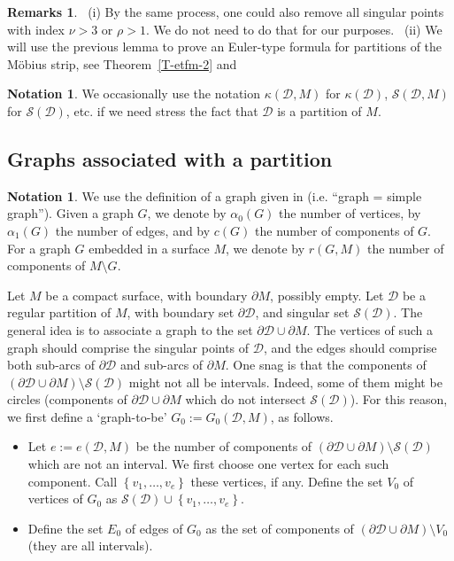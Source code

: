 \documentclass[12pt,a4paper]{amsart}
\theoremstyle{plain} %
\theoremstyle{definition}
\newtheorem{remarks}[theorem]{Remarks}
\newtheorem{notation}[theorem]{Notation}
\numberwithin{equation}{section}
\numberwithin{figure}{section}
\numberwithin{table}{section}
\newcommand{\cD}{\mathcal{D}}
\newcommand{\cS}{\mathcal{S}}
\newcommand{\sm}{\!\setminus\!}
\newcommand{\set}[1]{\left\lbrace #1 \right\rbrace}
\begin{document}
\begin{remarks}\label{R-parti-norm}~(i) By the same process, one could also remove all singular points with index $\nu > 3$ or $\rho > 1$. We do not need to do that for our purposes. ~(ii) We will use the previous lemma to prove an Euler-type formula for partitions of the M\"{o}bius strip, see Theorem~\ref{T-etfm-2} and
\cite{BeHe2020m}
\end{remarks}%


\begin{notation}\label{N-parti-4}
We occasionally use the notation $\kappa(\cD,M)$ for $\kappa(\cD)$, $\cS(\cD,M)$ for $\cS(\cD)$, etc. if we need stress the fact that $\cD$ is a partition of $M$.
\end{notation}%


\subsection{Graphs associated with a partition}\label{SS-gr}

\begin{notation}\label{N-gr-not}
We use the definition of a graph given in \cite{Gibl2010} (i.e. ``graph = simple graph''). Given a graph $G$, we denote by $\alpha_0(G)$ the number of vertices, by $\alpha_1(G)$ the number of edges, and by $c(G)$ the number of components of $G$. For a graph $G$ embedded in a surface $M$, we denote by $r(G,M)$ the number of components of $M \sm G$.
\end{notation}%

Let $M$ be a compact surface, with boundary $\partial M$, possibly empty. Let $\cD$ be a regular partition of $M$, with boundary set $\partial \cD$, and singular set $\cS(\cD)$. The general idea is to associate a graph to the set $\partial \cD \cup \partial M$. The vertices of such a graph should comprise the singular points of $\cD$, and the edges should comprise both sub-arcs of $\partial \cD$ and sub-arcs of $\partial M$. One snag is that the components of $\left( \partial \cD \cup \partial M \right) \sm \cS(\cD)$ might not all be intervals. Indeed, some of them might be circles (components  of $\partial \cD \cup \partial M$  which do not intersect $\cS(\cD)$). For this reason, we first define a `graph-to-be' $G_0 := G_0(\cD,M)$, as follows.\medskip

\begin{itemize}
  \item  Let $e := e(\cD,M)$ be the number of components of $\left( \partial \cD \cup \partial M \right) \sm \cS(\cD)$ which are not an interval. We first choose one vertex for each such component. Call $\set{v_1,\ldots, v_{e}}$ these vertices, if any. Define the set  $V_0$ of vertices of $G_0$ as $\cS(\cD) \cup \set{v_1,\ldots, v_{e}}$.
  \item Define the set $E_0$ of edges of $G_0$ as the set of components of $\left( \partial \cD \cup \partial M\right) \sm V_0$ (they are all intervals).
\end{itemize}
\end{document}
